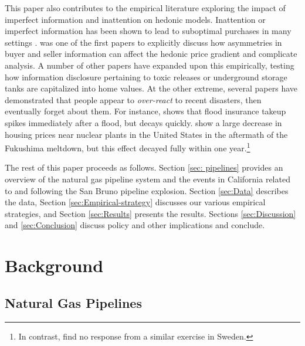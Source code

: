 \documentclass[12pt]{article}
\begin{document}
This paper also contributes to the empirical literature exploring the impact of imperfect information and inattention on hedonic models. Inattention or imperfect information has been shown to lead to suboptimal purchases in many settings \citep{chetty_salience_2009}. \citet{pope_buyer_2008} was one of the first papers to explicitly discuss how asymmetries in buyer and seller information can affect the hedonic price gradient and complicate analysis. A number of other papers have expanded upon this empirically, testing how information disclosure pertaining to toxic releases \citep{mastromonaco_environmental_2015} or underground storage tanks \citep{guignet_what_2013} are capitalized into home values. At the other extreme, several papers have demonstrated that people appear to \emph{over-react} to recent disasters, then eventually forget about them. For instance, \citet{gallagher_learning_2014} shows that flood insurance takeup spikes immediately after a flood, but decays quickly. \citet{TANAKA2018411} show a large decrease in housing prices near nuclear plants in the United States in the aftermath of the Fukushima meltdown, but this effect decayed fully within one year.\footnote{In contrast, \citet{ANDO201713} find no response from a similar exercise in Sweden.}

The rest of this paper proceeds as follows. Section \ref{sec: pipelines} provides an overview of the natural gas pipeline system and the events in California related to and following the San Bruno pipeline explosion. Section \ref{sec:Data} describes the data, Section \ref{sec:Empirical-strategy} discusses our various empirical strategies, and Section \ref{sec:Results} presents the results. Sections \ref{sec:Discussion} and \ref{sec:Conclusion} discuss policy and other implications and conclude.

\section{Background\label{sec: pipelines}}

\subsection{Natural Gas Pipelines}
\end{document}
